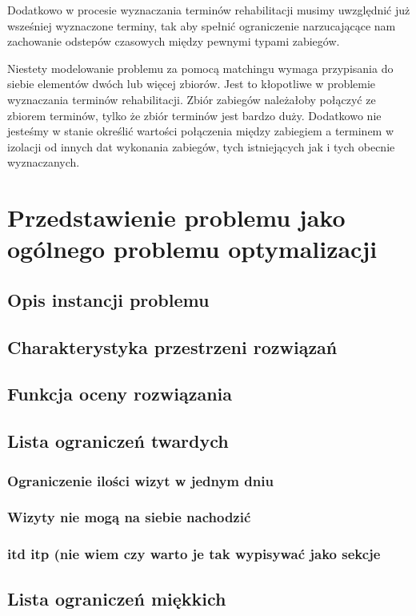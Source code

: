 Dodatkowo w procesie wyznaczania terminów rehabilitacji musimy uwzględnić już wsześniej wyznaczone terminy, tak aby spełnić ograniczenie narzucającące nam zachowanie odstepów czasowych między pewnymi typami zabiegów.

Niestety modelowanie problemu za pomocą matchingu wymaga przypisania do
siebie elementów dwóch lub więcej zbiorów. Jest to kłopotliwe w problemie wyznaczania
terminów rehabilitacji. Zbiór zabiegów należałoby połączyć ze zbiorem
terminów, tylko że zbiór terminów jest bardzo duży. Dodatkowo nie jesteśmy w
stanie określić wartości połączenia między zabiegiem a terminem w
izolacji od innych dat wykonania zabiegów, tych istniejących jak i tych
obecnie wyznaczanych.

\chapter{Przedstawienie problemu jako ogólnego problemu optymalizacji}
\section{Opis instancji problemu}
\section{Charakterystyka przestrzeni rozwiązań}
\section{Funkcja oceny rozwiązania}
\section{Lista ograniczeń twardych \label{constraints}}
\subsection{Ograniczenie ilości wizyt w jednym dniu}
\subsection{Wizyty nie mogą na siebie nachodzić}
\subsection{itd itp (nie wiem czy warto je tak wypisywać jako sekcje}
\section{Lista ograniczeń miękkich}
